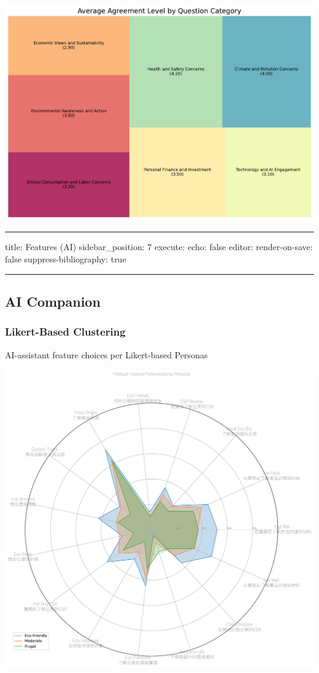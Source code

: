 \documentclass[
  letterpaper,
  DIV=11,
  numbers=noendperiod]{scrartcl}
\begin{document}
\includegraphics{_thesis_files/figure-pdf/cell-30-output-1.pdf}

\begin{center}\rule{0.5\linewidth}{0.5pt}\end{center}

title: Features (AI) sidebar\_position: 7 execute: echo: false editor:
render-on-save: false suppress-bibliography: true

\begin{center}\rule{0.5\linewidth}{0.5pt}\end{center}

\subsection{AI Companion}\label{ai-companion}

\subsubsection{Likert-Based Clustering}\label{likert-based-clustering}

AI-assistant feature choices per Likert-based Personas

\includegraphics{_thesis_files/figure-pdf/cell-32-output-1.pdf}
\end{document}
